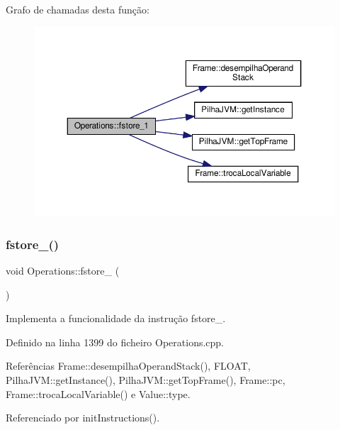 Grafo de chamadas desta função\+:\nopagebreak
\begin{figure}[H]
\begin{center}
\leavevmode
\includegraphics[width=350pt]{classOperations_a2ea876acd29db9eec798302229bfd5e5_cgraph}
\end{center}
\end{figure}
\mbox{\label{classOperations_a6d0a2faa9f164d49accf491a95364e2f}} 
\subsubsection{\texorpdfstring{fstore\+\_()}{fstore\_2()}}
{\footnotesize\ttfamily void Operations\+::fstore\+\_ (\begin{DoxyParamCaption}{ }\end{DoxyParamCaption})\hspace{0.3cm}{\ttfamily [private]}}



Implementa a funcionalidade da instrução fstore\+\_. 



Definido na linha 1399 do ficheiro Operations.\+cpp.



Referências Frame\+::desempilha\+Operand\+Stack(), F\+L\+O\+AT, Pilha\+J\+V\+M\+::get\+Instance(), Pilha\+J\+V\+M\+::get\+Top\+Frame(), Frame\+::pc, Frame\+::troca\+Local\+Variable() e Value\+::type.



Referenciado por init\+Instructions().


